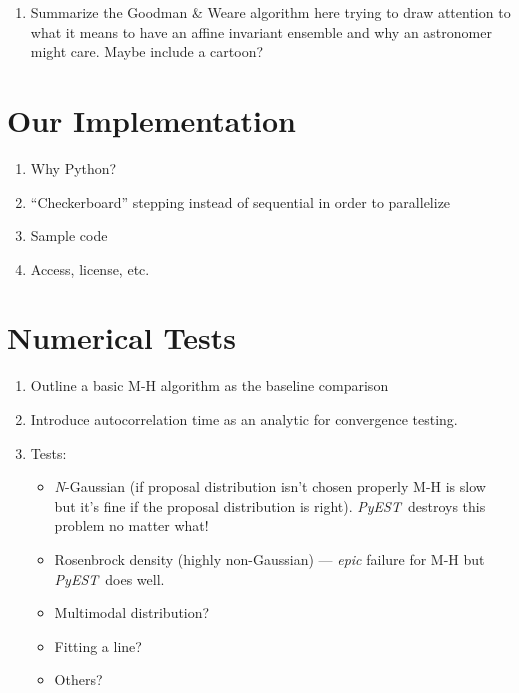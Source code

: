 \documentclass[12pt,preprint]{aastex}
\newcommand{\project}[1]{\textsl{#1}}
\newcommand{\this}{\project{PyEST}}
\begin{document}
\begin{enumerate}

    \item Summarize the Goodman \& Weare algorithm here trying to draw attention
        to what it means to have an affine invariant ensemble and why an astronomer
        might care. Maybe include a cartoon?

\end{enumerate}

\section{Our Implementation}

\begin{enumerate}

    \item Why Python?

    \item ``Checkerboard'' stepping instead of sequential in order to parallelize

    \item Sample code

    \item Access, license, etc.

\end{enumerate}

\section{Numerical Tests}

\begin{enumerate}

    \item Outline a basic M-H algorithm as the baseline comparison

    \item Introduce autocorrelation time as an analytic for convergence testing.

    \item Tests:
        \begin{itemize}
            \item \emph{N}-Gaussian (if proposal distribution isn't chosen properly
                M-H is slow but it's fine if the proposal distribution is right).
                \this~destroys this problem no matter what!

            \item Rosenbrock density (highly non-Gaussian) --- \emph{epic} failure
                for M-H but \this~does well.

            \item Multimodal distribution?

            \item Fitting a line?

            \item Others?
        \end{itemize}

\end{enumerate}
\end{document}
